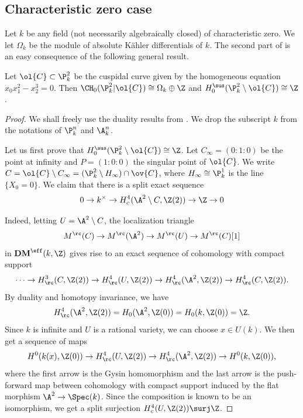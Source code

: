 \subsection{Characteristic zero case}\label{sec:Char-0}
Let $k$ be any field (not necessarily algebraically closed) of characteristic zero.
We let $\Omega_k$ be the module of absolute Kähler differentials of $k$.
The second part of  is an easy consequence of the following
general result.

\begin{thm}\label{thm:Failure}
Let $\ol{C} \subset \P^2_k$ be
the cuspidal curve given by the homogeneous equation
$x_0x^2_1-x^3_2 = 0$. Then $\CH_0(\P^2_k|\ol{C}) \cong \Omega_k \oplus \Z$ and
$H^{\sus}_0(\P^2_k \setminus \ol{C}) \cong \Z$.
\end{thm}
\begin{proof}
We shall freely use the duality results from \cite{VoevTriangCat}.
We drop the subscript $k$ from the notations of $\P^n_k$ and $\A^n_k$.

Let us first prove that $H^{\sus}_0(\P^2_k\setminus \ol{C}) \cong \Z$. Let
$C_\infty = (0:1:0)$ be the point at infinity and $P = (1:0:0)$ the singular
point of $\ol{C}$. We write
$C = \ol{C} \setminus C_\infty = (\P^2_k \setminus H_\infty) \cap \ov{C}$, where
$H_\infty \cong \P^1_k$ is the line $\{X_0 =0\}$.
We claim that there is a split exact sequence
\begin{equation}\label{eqn:RussellChow}
0\to k^\times \to H_{c }^4(\A^2 \setminus C, \Z(2)) \to \Z\to 0
\end{equation}

Indeed, letting $U = \A^2\setminus C$, the localization triangle
\[M^\rc(C) \to M^\rc(\A^2)\to M^\rc(U)\to M^\rc(C)[1]\]
in ${\mathbf{DM}}^{\eff}(k, \Z)$ gives rise to
an exact sequence of cohomology with compact support
\begin{equation}\label{eq:computehom}
\cdots \to H_{\rc}^3(C, \Z(2)) \to H_{\rc}^4(U, \Z(2)) \to H_{\rc}^4(\A^2, \Z(2)) \to
H_{\rc}^4(C, \Z(2)).
\end{equation}
By duality and homotopy invariance, we have
\[
H_{\rc}^4(\A^2, \Z(2)) =
H_0(\A^2, \Z(0)) = H_0(k, \Z(0)) =\Z.
\]
Since $k$ is infinite and $U$ is a rational variety, we can choose
$x \in U(k)$. We then get a sequence of maps
\[
H^0(k(x), \Z(0)) \to H_{\rc}^4(U, \Z(2)) \to H_{\rc}^4(\A^2, \Z(2)) \to
H^0(k, \Z(0)),
\]
where the first arrow is the Gysin homomorphism and the last arrow is the
push-forward map between cohomology with compact support induced by the
flat morphism $\A^2 \to \Spec(k)$. Since the composition is known to be
an isomorphism, we get a split surjection $H_{c }^4(U, \Z(2)) \surj \Z$.


\end{proof}
